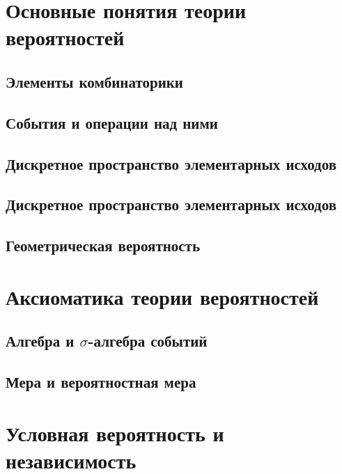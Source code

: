 \section{Основные понятия теории вероятностей}

\subsection{Элементы комбинаторики}


\subsection{События и операции над ними}


\subsection{Дискретное пространство элементарных исходов}


\subsection{Дискретное пространство элементарных исходов}


\subsection{Геометрическая вероятность}





\section{Аксиоматика теории вероятностей}

\subsection{Алгебра и \texorpdfstring{$\sigma$}{сигма}-алгебра событий}


\subsection{Мера и вероятностная мера}





\section{Условная вероятность и независимость}

